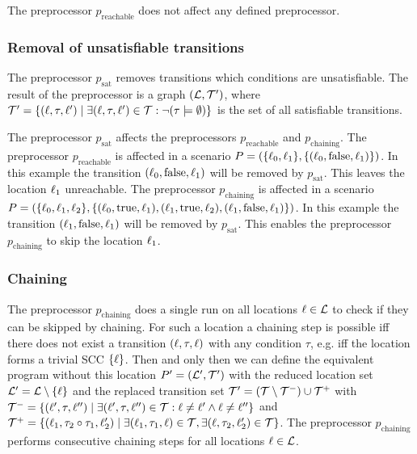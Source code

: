 The preprocessor $p_{\text{reachable}}$ does not affect any defined preprocessor.

\subsubsection{Removal of unsatisfiable transitions}

The preprocessor $p_{\text{sat}}$ removes transitions which conditions are unsatisfiable.
The result of the preprocessor is a graph $(\mathcal{L}, \mathcal{T}')$, where $\mathcal{T}' = \lbrace (\ell,\tau,\ell') \mid \exists (\ell,\tau,\ell') \in \mathcal{T}: \neg (\tau \models \emptyset) \rbrace$ is the set of all satisfiable transitions.

The preprocessor $p_{\text{sat}}$ affects the preprocessors $p_{\text{reachable}}$ and $p_{\text{chaining}}$.
The preprocessor $p_{\text{reachable}}$ is affected in a scenario $P = (\lbrace \ell_0, \ell_1 \rbrace, \lbrace (\ell_0,\text{false},\ell_1) \rbrace)$.
In this example the transition $(\ell_0,\text{false},\ell_1)$ will be removed by $p_{\text{sat}}$.
This leaves the location $\ell_1$ unreachable.
The preprocessor $p_{\text{chaining}}$ is affected in a scenario $P = (\lbrace \ell_0, \ell_1, \ell_2 \rbrace, \lbrace (\ell_0,\text{true},\ell_1), (\ell_1,\text{true},\ell_2), (\ell_1,\text{false},\ell_1) \rbrace)$.
In this example the transition $(\ell_1,\text{false},\ell_1)$ will be removed by $p_{\text{sat}}$.
This enables the preprocessor $p_{\text{chaining}}$ to skip the location $\ell_1$.

\subsubsection{Chaining}

The preprocessor $p_{\text{chaining}}$ does a single run on all locations $\ell \in \mathcal{L}$ to check if they can be skipped by chaining.
For such a location a chaining step is possible iff there does not exist a transition $(\ell,\tau,\ell)$ with any condition $\tau$, e.g. iff the location forms a trivial SCC $\lbrace \ell \rbrace$.
Then and only then we can define the equivalent program without this location $P' = (\mathcal{L}', \mathcal{T}')$ with the reduced location set $\mathcal{L}' = \mathcal{L} \setminus \lbrace \ell \rbrace$ and the replaced transition set $\mathcal{T}' = (\mathcal{T} \setminus \mathcal{T}^-) \cup \mathcal{T}^+$ with $\mathcal{T}^- = \lbrace (\ell',\tau,\ell'') \mid \exists (\ell',\tau,\ell'') \in \mathcal{T}: \ell \neq \ell' \wedge \ell \neq \ell'' \rbrace$ and $\mathcal{T}^+ = \lbrace (\ell_1,\tau_2 \circ \tau_1,\ell_2') \mid \exists (\ell_1,\tau_1,\ell) \in \mathcal{T}, \exists (\ell,\tau_2,\ell_2') \in \mathcal{T} \rbrace$.
The preprocessor $p_{\text{chaining}}$ performs consecutive chaining steps for all locations $\ell \in \mathcal{L}$.

